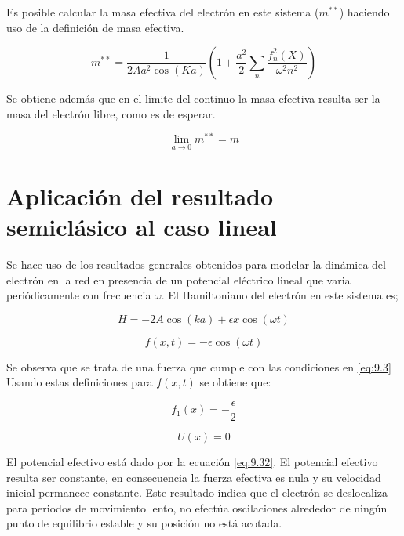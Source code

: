 Es posible calcular la masa efectiva del electrón en este sistema ($m^{**}$) haciendo uso de la definición de masa efectiva.

\begin{equation}
    m^{**}=\frac{1}{2Aa^2\cos(Ka)}\left(1+\frac{a^2}{2}\sum_n \frac{f_n^2(X)}{\omega^2n^2}\right)
\end{equation}

Se obtiene además que en el limite del continuo la masa efectiva resulta ser la masa del electrón libre, como es de esperar.

\begin{equation}
    \lim_{a \rightarrow 0}m^{**}=m
\end{equation}

\section{Aplicación del resultado semiclásico al caso lineal}

Se hace uso de los resultados generales obtenidos para modelar la dinámica del electrón en la red en presencia de un potencial eléctrico lineal que varia periódicamente con frecuencia $\omega$. El Hamiltoniano del electrón en este sistema es;

\begin{equation}\label{eq:9.28}
  H=-2A\cos(k a)+\epsilon x\cos{( \omega t)}  
\end{equation}


\begin{equation}\label{eq:9.29}
    f(x,t)=-\epsilon \cos(\omega t)
\end{equation}

Se observa que se trata de una fuerza que cumple con las condiciones en \ref{eq:9.3} %
Usando estas definiciones para $f(x,t)$ se obtiene que:

\begin{equation}\label{eq:9.30}
    f_{1}(x)=-\frac{\epsilon}{2}
\end{equation}

\begin{equation}\label{eq:9.31}
    U(x)=0
\end{equation}

    

El potencial efectivo está dado por la ecuación \ref{eq:9.32}. El potencial efectivo resulta ser constante, en consecuencia la fuerza efectiva es nula y su velocidad inicial permanece constante. Este resultado indica que el electrón se deslocaliza para periodos de movimiento lento, no efectúa oscilaciones alrededor de ningún punto de equilibrio estable y su posición no está acotada. 


